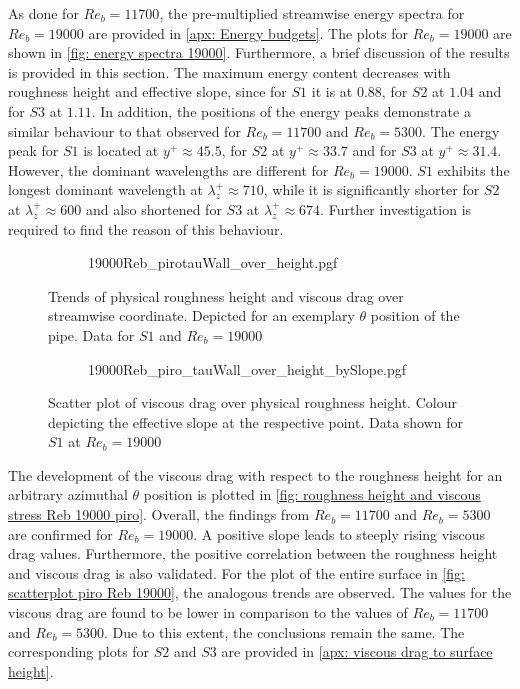 As done for $Re_b = 11700$, the pre-multiplied streamwise energy spectra for $Re_b = 19000$ are provided in \autoref{apx: Energy budgets}.
The plots for $Re_b = 19000$ are shown in \autoref{fig: energy spectra 19000}.
Furthermore, a brief discussion of the results is provided in this section.
The maximum energy content decreases with roughness height and effective slope, since for $S1$ it is at $0.88$, for $S2$ at $1.04$ and for $S3$ at $1.11$.
In addition, the positions of the energy peaks demonstrate a similar behaviour to that observed for $Re_b = 11700$ and $Re_b = 5300$.
The energy peak for $S1$ is located at $y^+ \approx 45.5$, for $S2$ at $y^+ \approx 33.7$ and for $S3$ at $y^+ \approx 31.4$.
However, the dominant wavelengths are different for $Re_b = 19000$.
$S1$ exhibits the longest dominant wavelength at $\lambda_z^+ \approx 710$, while it is significantly shorter for $S2$ at $\lambda_z^+ \approx 600$ and also shortened for $S3$ at $\lambda_z^+ \approx 674$.
Further investigation is required to find the reason of this behaviour.

\begin{figure}
    \centering
    \begin{subfigure}{0.75\textwidth}
        \centering
        {19000Reb_pirotauWall_over_height.pgf}
    \end{subfigure}
    \caption[Trends of physical roughness height and viscous drag over streamwise coordinate at $Re_b = 19000$]{Trends of physical roughness height and viscous drag over streamwise coordinate. Depicted for an exemplary $\theta$ position of the pipe. Data for $S1$ and $Re_b = 19000$}
    \label{fig: roughness height and viscous stress Reb 19000 piro}
\end{figure}
\begin{figure}
    \centering
    \begin{subfigure}{0.7\textwidth}
        \hspace{0.9cm}
        {19000Reb_piro_tauWall_over_height_bySlope.pgf}
    \end{subfigure}
    \caption[Scatter plot of viscous drag over physical roughness height at $Re_b = 19000$]{Scatter plot of viscous drag over physical roughness height. Colour depicting the effective slope at the respective point. Data shown for $S1$ at $Re_b = 19000$}
    \label{fig: scatterplot piro Reb 19000}
\end{figure}
The development of the viscous drag with respect to the roughness height for an arbitrary azimuthal $\theta$ position is plotted in \autoref{fig: roughness height and viscous stress Reb 19000 piro}.
Overall, the findings from $Re_b = 11700$ and $Re_b = 5300$ are confirmed for $Re_b = 19000$.
A positive slope leads to steeply rising viscous drag values.
Furthermore, the positive correlation between the roughness height and viscous drag is also validated.
For the plot of the entire surface in \autoref{fig: scatterplot piro Reb 19000}, the analogous trends are observed.
The values for the viscous drag are found to be lower in comparison to the values of $Re_b = 11700$ and $Re_b = 5300$.
Due to this extent, the conclusions remain the same.
The corresponding plots for $S2$ and $S3$ are provided in \autoref{apx: viscous drag to surface height}.
\newpage
